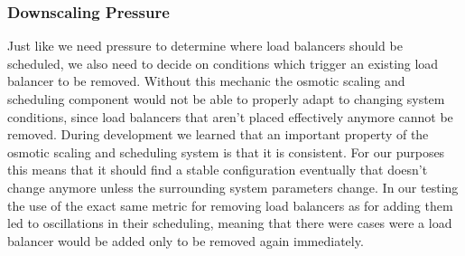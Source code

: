 \subsubsection{Downscaling Pressure}
Just like we need pressure to determine where load balancers should be scheduled, we also need to decide on conditions which trigger an existing load balancer to be removed.
Without this mechanic the osmotic scaling and scheduling component would not be able to properly adapt to changing system conditions, since load balancers that aren't placed effectively anymore cannot be removed.
During development we learned that an important property of the osmotic scaling and scheduling system is that it is consistent.
For our purposes this means that it should find a stable configuration eventually that doesn't change anymore unless the surrounding system parameters change.
In our testing the use of the exact same metric for removing load balancers as for adding them led to oscillations in their scheduling, meaning that there were cases were a load balancer would be added only to be removed again immediately.

